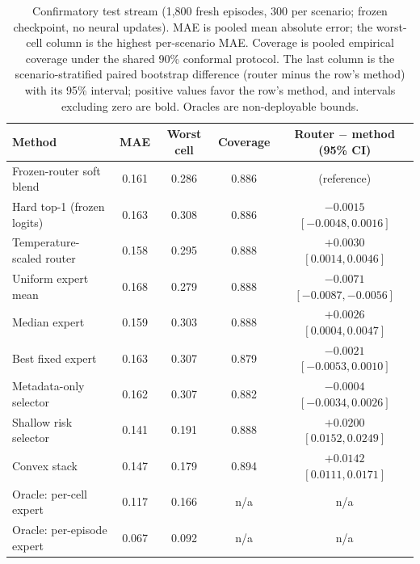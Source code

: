 \documentclass[electronics,article,submit,oneauthor]{Definitions/mdpi}
\begin{document}
\begin{table}[!t]
\caption{Confirmatory test stream (1,800 fresh episodes, 300 per scenario; frozen checkpoint, no neural updates). MAE is pooled mean absolute error; the worst-cell column is the highest per-scenario MAE. Coverage is pooled empirical coverage under the shared 90\% conformal protocol. The last column is the scenario-stratified paired bootstrap difference (router minus the row's method) with its 95\% interval; positive values favor the row's method, and intervals excluding zero are bold. Oracles are non-deployable bounds.\label{tab:confirmatory}}
\footnotesize
\begin{tabularx}{\textwidth}{lCCC>{\scriptsize\arraybackslash}C}
\toprule
\textbf{Method} & \textbf{MAE} & \textbf{Worst cell} & \textbf{Coverage} & \textbf{Router $-$ method (95\% CI)}\\
\midrule
Frozen-router soft blend & 0.161 & 0.286 & 0.886 & (reference)\\
Hard top-1 (frozen logits) & 0.163 & 0.308 & 0.886 & $-0.0015$ $[-0.0048, 0.0016]$\\
Temperature-scaled router & 0.158 & 0.295 & 0.888 & $\mathbf{+0.0030}$ $[0.0014, 0.0046]$\\
Uniform expert mean & 0.168 & 0.279 & 0.888 & $\mathbf{-0.0071}$ $[-0.0087, -0.0056]$\\
Median expert & 0.159 & 0.303 & 0.888 & $\mathbf{+0.0026}$ $[0.0004, 0.0047]$\\
Best fixed expert & 0.163 & 0.307 & 0.879 & $-0.0021$ $[-0.0053, 0.0010]$\\
Metadata-only selector & 0.162 & 0.307 & 0.882 & $-0.0004$ $[-0.0034, 0.0026]$\\
Shallow risk selector & 0.141 & 0.191 & 0.888 & $\mathbf{+0.0200}$ $[0.0152, 0.0249]$\\
Convex stack & 0.147 & 0.179 & 0.894 & $\mathbf{+0.0142}$ $[0.0111, 0.0171]$\\
\midrule
Oracle: per-cell expert & 0.117 & 0.166 & n/a & n/a\\
Oracle: per-episode expert & 0.067 & 0.092 & n/a & n/a\\
\bottomrule
\end{tabularx}
\end{table}
\end{document}
